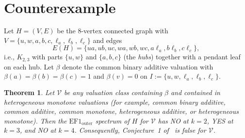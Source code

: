 \documentclass[11pt]{article}
\newtheorem{theorem}{Theorem}[section]
\theoremstyle{remark}
\begin{document}
\section{Counterexample}

Let $H = (V, E)$ be the $8$-vertex connected graph with $V = \{u, w, a, b, c, \ell_a, \ell_b, \ell_c\}$ and edges
\[
E(H) = \{ua, ub, uc, wa, wb, wc, a\ell_a, b\ell_b, c\ell_c\},
\]
i.e., $K_{2,3}$ with parts $\{u, w\}$ and $\{a, b, c\}$ (the \emph{hubs}) together with a pendant leaf on each hub. Let $\beta$ denote the common binary additive valuation with $\beta(a) = \beta(b) = \beta(c) = 1$ and $\beta(v) = 0$ on $I := \{u, w, \ell_a, \ell_b, \ell_c\}$.

\begin{theorem}\label{thm:main}
Let $\mathcal{V}$ be any valuation class containing $\beta$ and contained in heterogeneous monotone valuations (for example, common binary additive, common additive, common monotone, heterogeneous additive, or heterogeneous monotone). Then the $\mathrm{EF1}_{\mathrm{outer}}$ spectrum of $H$ for $\mathcal{V}$ has \textup{NO} at $k = 2$, \textup{YES} at $k = 3$, and \textup{NO} at $k = 4$. Consequently, Conjecture~1 of~\cite{CZ2024,BCTZ2026} is false for $\mathcal{V}$.
\end{theorem}
\end{document}
